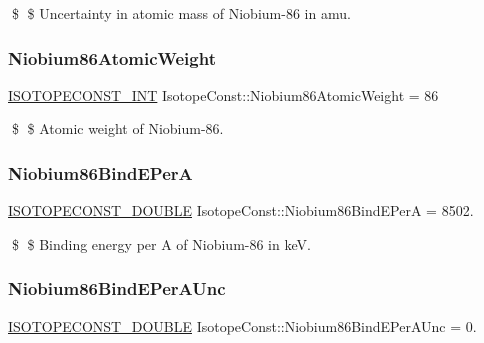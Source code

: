 \$ \$ Uncertainty in atomic mass of Niobium-\/86 in amu. \mbox{\label{group___isotope_const-_niobium-_nb86_ga0cbd916826253c970c2d9925e7c8d216}} 
\subsubsection{\texorpdfstring{Niobium86\+Atomic\+Weight}{Niobium86AtomicWeight}}
{\footnotesize\ttfamily \mbox{\hyperlink{group___isotope_const-_macros_ga5f18360b3e99483a35c32d789e62621c}{I\+S\+O\+T\+O\+P\+E\+C\+O\+N\+S\+T\+\_\+\+I\+NT}} Isotope\+Const\+::\+Niobium86\+Atomic\+Weight = 86}

\$ \$ Atomic weight of Niobium-\/86. \mbox{\label{group___isotope_const-_niobium-_nb86_gaf447f62dc424ae8222c3dfeac6929057}} 
\subsubsection{\texorpdfstring{Niobium86\+Bind\+E\+PerA}{Niobium86BindEPerA}}
{\footnotesize\ttfamily \mbox{\hyperlink{group___isotope_const-_macros_ga8f45a7272ce02c0b4c65c44636ed719a}{I\+S\+O\+T\+O\+P\+E\+C\+O\+N\+S\+T\+\_\+\+D\+O\+U\+B\+LE}} Isotope\+Const\+::\+Niobium86\+Bind\+E\+PerA = 8502.}

\$ \$ Binding energy per A of Niobium-\/86 in keV. \mbox{\label{group___isotope_const-_niobium-_nb86_ga3e9fcd49b5a315a7982f0695e4ff2a43}} 
\subsubsection{\texorpdfstring{Niobium86\+Bind\+E\+Per\+A\+Unc}{Niobium86BindEPerAUnc}}
{\footnotesize\ttfamily \mbox{\hyperlink{group___isotope_const-_macros_ga8f45a7272ce02c0b4c65c44636ed719a}{I\+S\+O\+T\+O\+P\+E\+C\+O\+N\+S\+T\+\_\+\+D\+O\+U\+B\+LE}} Isotope\+Const\+::\+Niobium86\+Bind\+E\+Per\+A\+Unc = 0.}

